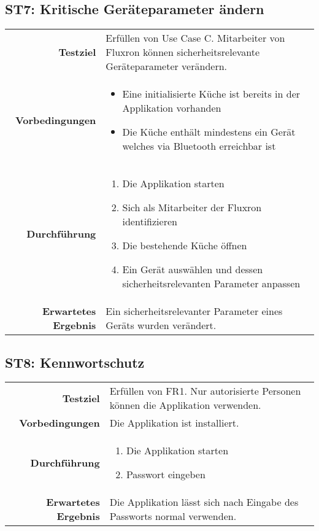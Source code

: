 \subsection{ST7: Kritische Geräteparameter ändern}
\begin{table}[H]
\begin{tabularx}{\textwidth}{r X }
\textbf{Testziel} & Erfüllen von Use Case C. Mitarbeiter von Fluxron können sicherheitsrelevante Geräteparameter verändern. \\
\textbf{Vorbedingungen} & \begin{itemize}
\item Eine initialisierte Küche ist bereits in der Applikation vorhanden
\item Die Küche enthält mindestens ein Gerät welches via Bluetooth erreichbar ist
\end{itemize} \\
\textbf{Durchführung} & \begin{enumerate}
\item Die Applikation starten
\item Sich als Mitarbeiter der Fluxron identifizieren
\item Die bestehende Küche öffnen
\item Ein Gerät auswählen und dessen sicherheitsrelevanten Parameter anpassen
\end{enumerate} \\
\textbf{Erwartetes Ergebnis} & Ein sicherheitsrelevanter Parameter eines Geräts wurden verändert.\\
\end{tabularx}
\end{table}

\subsection{ST8: Kennwortschutz}
\begin{table}[H]
\begin{tabularx}{\textwidth}{r X }
\textbf{Testziel} & Erfüllen von \ac{FR}1. Nur autorisierte Personen können die Applikation verwenden.\\
\textbf{Vorbedingungen} & Die Applikation ist installiert.\\
\textbf{Durchführung} & \begin{enumerate}
\item Die Applikation starten
\item Passwort eingeben
\end{enumerate} \\
\textbf{Erwartetes Ergebnis} & Die Applikation lässt sich nach Eingabe des Passworts normal verwenden.\\
\end{tabularx}
\end{table}

